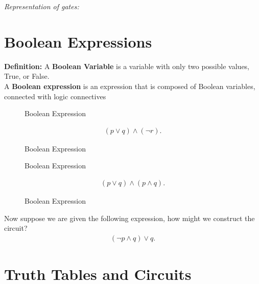 \documentclass{report}
\begin{document}
    \pagebreak \bigbreak \noindent 
    \textit{Representation of gates:}
    \bigbreak \noindent 
\begin{figure}[ht]
    \centering
    \label{fig:icry2}
\end{figure}

    \bigbreak \noindent \bigbreak \noindent 
    \section{Boolean Expressions}
    \bigbreak \noindent 
    \begin{mdframed}
        \textbf{Definition:}
        A \textbf{Boolean Variable} is a variable with only two possible values, True, or False. \\
       A \textbf{Boolean expression} is an expression that is composed of Boolean variables, connected with logic connectives
    \end{mdframed}
    \bigbreak \noindent 
\begin{figure}[ht]
    \begin{minipage}{0.5\textwidth}
        \centering
        \caption{Boolean Expression}
        \label{fig:booleanfig}
    \end{minipage}
    \begin{minipage}{0.47\textwidth}
        \begin{align*}
            (p \lor q) \land (\neg r)
        .\end{align*}
    \caption{Boolean Expression}
    \label{fig:booleanfig}
    \end{minipage}
\end{figure}

    \pagebreak \bigbreak \noindent 

\begin{figure}[ht]

    \begin{minipage}{0.47\textwidth}
        \centering
        \caption{Boolean Expression}
        \label{fig:booleanfig23}
    \end{minipage}
    \begin{minipage}{0.47\textwidth}
    \begin{align*}
        (p\lor q) \land (p \land q)
    .\end{align*}
    \caption{Boolean Expression}
    \label{fig:booleanfig23}
    \end{minipage}
\end{figure}
    \bigbreak \noindent 
    Now suppose we are given the following expression, how might we construct the circuit?
    \begin{align*}
        (\neg p  \land q)  \lor q
    .\end{align*}
    \bigbreak \noindent 
\begin{figure}[ht]
    \centering
    \label{fig:booleanmagic}
\end{figure}
    
    \bigbreak \noindent \bigbreak \noindent 
    \section{Truth Tables and Circuits}
    \bigbreak \noindent 



    






    
\end{document}
